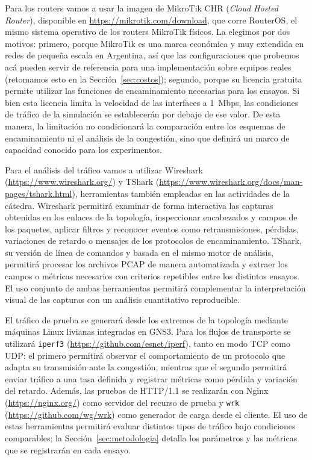 \documentclass[11pt,a4paper]{article}
\begin{document}
Para los routers vamos a usar la imagen de MikroTik CHR (\textit{Cloud Hosted Router}), disponible en \url{https://mikrotik.com/download}, que corre RouterOS, el mismo sistema operativo de los routers MikroTik f\'isicos. La elegimos por dos motivos: primero, porque MikroTik es una marca econ\'omica y muy extendida en redes de peque\~na escala en Argentina, as\'i que las configuraciones que probemos ac\'a pueden servir de referencia para una implementaci\'on sobre equipos reales (retomamos esto en la Secci\'on~\ref{sec:costos}); segundo, porque su licencia gratuita permite utilizar las funciones de encaminamiento necesarias para los ensayos. Si bien esta licencia limita la velocidad de las interfaces a 1~Mbps, las condiciones de tr\'afico de la simulaci\'on se establecer\'an por debajo de ese valor. De esta manera, la limitaci\'on no condicionar\'a la comparaci\'on entre los esquemas de encaminamiento ni el an\'alisis de la congesti\'on, sino que definir\'a un marco de capacidad conocido para los experimentos.

Para el an\'alisis del tr\'afico vamos a utilizar Wireshark (\url{https://www.wireshark.org/}) y TShark (\url{https://www.wireshark.org/docs/man-pages/tshark.html}), herramientas tambi\'en empleadas en las actividades de la c\'atedra. Wireshark permitir\'a examinar de forma interactiva las capturas obtenidas en los enlaces de la topolog\'ia, inspeccionar encabezados y campos de los paquetes, aplicar filtros y reconocer eventos como retransmisiones, p\'erdidas, variaciones de retardo o mensajes de los protocolos de encaminamiento. TShark, su versi\'on de l\'inea de comandos y basada en el mismo motor de an\'alisis, permitir\'a procesar los archivos PCAP de manera automatizada y extraer los campos o m\'etricas necesarios con criterios repetibles entre los distintos ensayos. El uso conjunto de ambas herramientas permitir\'a complementar la interpretaci\'on visual de las capturas con un an\'alisis cuantitativo reproducible.

El tr\'afico de prueba se generar\'a desde los extremos de la topolog\'ia mediante m\'aquinas Linux livianas integradas en GNS3. Para los flujos de transporte se utilizar\'a \texttt{iperf3} (\url{https://github.com/esnet/iperf}), tanto en modo TCP como UDP: el primero permitir\'a observar el comportamiento de un protocolo que adapta su transmisi\'on ante la congesti\'on, mientras que el segundo permitir\'a enviar tr\'afico a una tasa definida y registrar m\'etricas como p\'erdida y variaci\'on del retardo. Adem\'as, las pruebas de HTTP/1.1 se realizar\'an con Nginx (\url{https://nginx.org/}) como servidor del recurso de prueba y \texttt{wrk} (\url{https://github.com/wg/wrk}) como generador de carga desde el cliente. El uso de estas herramientas permitir\'a evaluar distintos tipos de tr\'afico bajo condiciones comparables; la Secci\'on~\ref{sec:metodologia} detalla los par\'ametros y las m\'etricas que se registrar\'an en cada ensayo.
\end{document}
